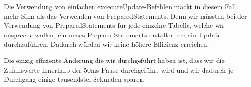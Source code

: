 Die Verwendung von einfachen excecuteUpdate-Befehlen macht in diesem Fall mehr
Sinn als das Verwenden von PreparedStatements. Denn wir müssten bei der
Verwendung von PreparedStatements für jede einzelne Tabelle, welche wir
anspreche wollen, ein neues PreparedStatements erstellen um ein Update
durchzuführen. Dadurch würden wir keine höhere Effizienz erreichen.

Die einzig effiziente Änderung die wir durchgeführt haben ist, dass wir die
Zufallswerte innerhalb der 50ms Pause durchgeführt wird und wir dadurch je
Durchgang einige tausendstel Sekunden sparen.

\clearpage
